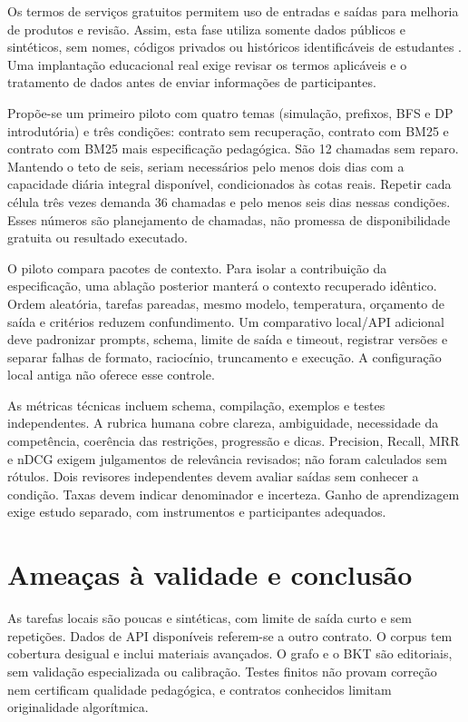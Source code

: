 \documentclass[12pt]{article}
\begin{document}
Os termos de serviços gratuitos permitem uso de entradas e saídas para melhoria de produtos e revisão. Assim, esta fase utiliza somente dados públicos e sintéticos, sem nomes, códigos privados ou históricos identificáveis de estudantes \cite{googleterms2026}. Uma implantação educacional real exige revisar os termos aplicáveis e o tratamento de dados antes de enviar informações de participantes.

Propõe-se um primeiro piloto com quatro temas (simulação, prefixos, BFS e DP introdutória) e três condições: contrato sem recuperação, contrato com BM25 e contrato com BM25 mais especificação pedagógica. São 12 chamadas sem reparo. Mantendo o teto de seis, seriam necessários pelo menos dois dias com a capacidade diária integral disponível, condicionados às cotas reais. Repetir cada célula três vezes demanda 36 chamadas e pelo menos seis dias nessas condições. Esses números são planejamento de chamadas, não promessa de disponibilidade gratuita ou resultado executado.

O piloto compara pacotes de contexto. Para isolar a contribuição da especificação, uma ablação posterior manterá o contexto recuperado idêntico. Ordem aleatória, tarefas pareadas, mesmo modelo, temperatura, orçamento de saída e critérios reduzem confundimento. Um comparativo local/API adicional deve padronizar prompts, schema, limite de saída e timeout, registrar versões e separar falhas de formato, raciocínio, truncamento e execução. A configuração local antiga não oferece esse controle.

As métricas técnicas incluem schema, compilação, exemplos e testes independentes. A rubrica humana cobre clareza, ambiguidade, necessidade da competência, coerência das restrições, progressão e dicas. Precision, Recall, MRR e nDCG exigem julgamentos de relevância revisados; não foram calculados sem rótulos. Dois revisores independentes devem avaliar saídas sem conhecer a condição. Taxas devem indicar denominador e incerteza. Ganho de aprendizagem exige estudo separado, com instrumentos e participantes adequados.

\section{Ameaças à validade e conclusão}
As tarefas locais são poucas e sintéticas, com limite de saída curto e sem repetições. Dados de API disponíveis referem-se a outro contrato. O corpus tem cobertura desigual e inclui materiais avançados. O grafo e o BKT são editoriais, sem validação especializada ou calibração. Testes finitos não provam correção nem certificam qualidade pedagógica, e contratos conhecidos limitam originalidade algorítmica.
\end{document}
